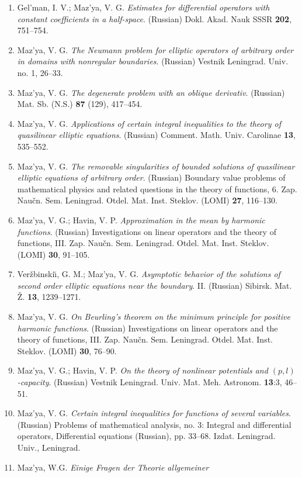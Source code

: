 \documentclass{article}
\begin{document}
\begin{enumerate}
{\bf 1972}
\item Gel'man, I. V.; Maz'ya, V. G. {\it Estimates for differential
operators with constant coefficients
in a half-space}. (Russian) Dokl. Akad. Nauk SSSR {\bf 202}, 751--754.
\item Maz'ya, V. G. {\it The Neumann problem for elliptic operators of
arbitrary order in domains with
nonregular boundaries}. (Russian) Vestnik Leningrad. Univ. no. 1,
26--33.
\item Maz'ya, V. G. {\it The degenerate problem with an oblique
derivativ}.
(Russian) Mat. Sb. (N.S.) {\bf 87} (129),
417--454.
\item Maz'ya, V. G. {\it Applications of certain integral inequalities
to
the theory of quasilinear elliptic equations}.
(Russian) Comment. Math. Univ. Carolinae {\bf 13}, 535--552.
\item Maz'ya, V. G. {\it The removable singularities of bounded
solutions
of quasilinear elliptic equations
of arbitrary order}. (Russian) Boundary value problems of mathematical
physics and related questions in the theory of functions, 6.
Zap. Nau\v cn. Sem. Leningrad. Otdel. Mat. Inst. Steklov. (LOMI) {\bf
27},
116--130.
\item Maz'ya, V. G.; Havin, V. P. {\it Approximation in the mean by
harmonic functions}.
(Russian) Investigations on linear operators and the theory of
functions,
III. Zap. Nau\v cn. Sem. Leningrad. Otdel. Mat. Inst.
Steklov. (LOMI) {\bf 30}, 91--105.
\item Ver\v zbinski{\u\i}, G. M.; Maz'ya, V. G. {\it Asymptotic
behavior of
the solutions of second
order elliptic equations near the boundary}. II. (Russian) Sibirsk.
Mat. \v
Z. {\bf 13}, 1239--1271.
\item Maz'ya, V. G. {\it On Beurling's theorem on the minimum
principle for
positive harmonic functions}.
(Russian) Investigations on linear operators and the theory of
functions,
III. Zap. Nau\v cn. Sem. Leningrad. Otdel. Mat. Inst.
Steklov. (LOMI) {\bf 30}, 76--90.
\item Maz'ya, V. G.; Havin, V. P. {\it On the theory of nonlinear
potentials and $(p,l)$-capacity}. (Russian) Vestnik Leningrad.
Univ. Mat. Meh. Astronom. {\bf 13}:3, 46--51.
\item Maz'ya, V. G. {\it Certain integral inequalities for functions
of
several variables}.
(Russian) Problems of mathematical analysis, no. 3: Integral and
differential operators, Differential equations (Russian), pp.
33--68. Izdat. Leningrad. Univ., Leningrad.
\item Maz'ya, W.G. {\it Einige Fragen der Theorie allgemeiner
}
\end{enumerate}
\end{document}
